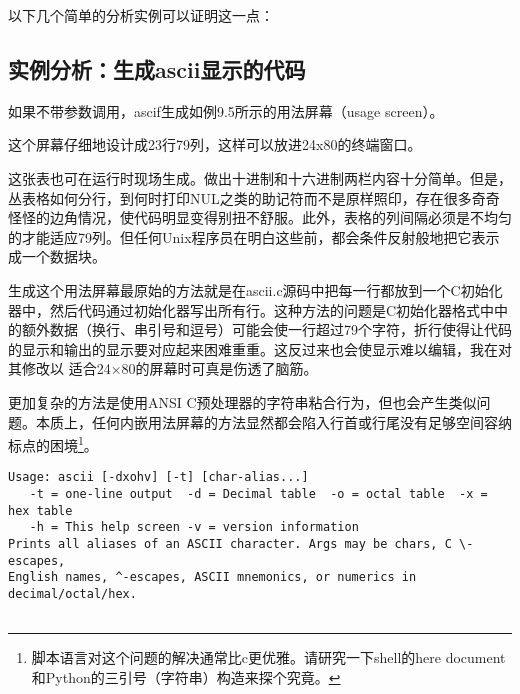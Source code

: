 \documentclass[12pt,oneside]{book}
\begin{document}
\begin{common-format}
以下几个简单的分析实例可以证明这一点：

\subsection{实例分析：生成ascii显示的代码}
如果不带参数调用，ascif生成如例9.5所示的用法屏幕（usage screen）。

这个屏幕仔细地设计成23行79列，这样可以放进24x80的终端窗口。

这张表也可在运行时现场生成。做出十进制和十六进制两栏内容十分简单。但是，丛表格如何分行，到何时打印NUL之类的助记符而不是原样照印，存在很多奇奇怪怪的边角情况，使代码明显变得别扭不舒服。此外，表格的列间隔必须是不均匀的才能适应79列。但任何Unix程序员在明白这些前，都会条件反射般地把它表示成一个数据块。

生成这个用法屏幕最原始的方法就是在ascii.c源码中把每一行都放到一个C初始化器中，然后代码通过初始化器写出所有行。这种方法的问题是C初始化器格式中中的额外数据（换行、串引号和逗号）可能会使一行超过79个字符，折行使得让代码的显示和输出的显示要对应起来困难重重。这反过来也会使显示难以编辑，我在对其修改以
适合24×80的屏幕时可真是伤透了脑筋。

更加复杂的方法是使用ANSI C预处理器的字符串粘合行为，但也会产生类似问题。本质上，任何内嵌用法屏幕的方法显然都会陷入行首或行尾没有足够空间容纳标点的困境\footnote{脚本语言对这个问题的解决通常比c更优雅。请研究一下shell的here document和Python的三引号（字符串）构造来探个究竟。}。

\begin{Verbatim}[label=例9.5 ascii用法屏幕]
Usage: ascii [-dxohv] [-t] [char-alias...]
   -t = one-line output  -d = Decimal table  -o = octal table  -x = hex table
   -h = This help screen -v = version information
Prints all aliases of an ASCII character. Args may be chars, C \-escapes,
English names, ^-escapes, ASCII mnemonics, or numerics in decimal/octal/hex.


\end{Verbatim}
\end{common-format}
\end{document}
